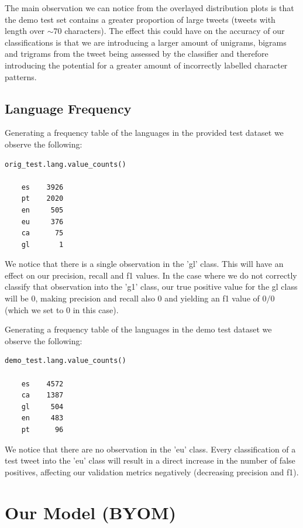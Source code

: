 \documentclass[runningheads]{llncs}
\begin{document}
The main observation we can notice from the overlayed distribution plots is that the demo test set contains a greater proportion of large tweets (tweets with length over $\sim 70$ characters). The effect this could have on the accuracy of our classifications is that we are introducing a larger amount of unigrams, bigrams and trigrams from the tweet being assessed by the classifier and therefore introducing the potential for a greater amount of incorrectly labelled character patterns.

\subsection{Language Frequency}

Generating a frequency table of the languages in the provided test dataset we observe the following:

\begin{verbatim}
orig_test.lang.value_counts()

    es    3926
    pt    2020
    en     505
    eu     376
    ca      75
    gl       1

\end{verbatim}

We notice that there is a single observation in the 'gl' class. This will have an effect on our precision, recall and f1 values. In the case where we do not correctly classify that observation into the 'g1' class, our true positive value for the gl class will be 0, making precision and recall also 0 and yielding an f1 value of $0/0$ (which we set to 0 in this case).

\medskip

Generating a frequency table of the languages in the demo test dataset we observe the following:

\begin{verbatim}
demo_test.lang.value_counts()

    es    4572
    ca    1387
    gl     504
    en     483
    pt      96

\end{verbatim}

We notice that there are no observation in the 'eu' class. Every classification of a test tweet into the 'eu' class will result in a direct increase in the number of false positives, affecting our validation metrics negatively (decreasing precision and f1).

\section{Our Model (BYOM)}
\end{document}
